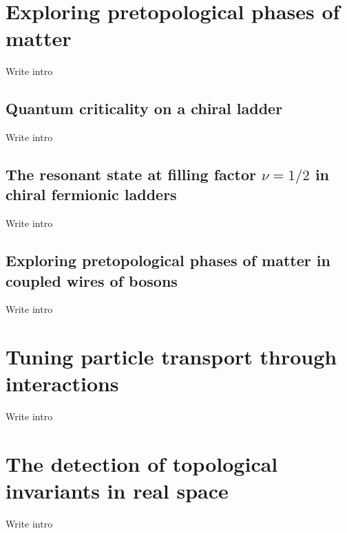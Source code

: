 
\chapter{Exploring pretopological phases of matter}
\label{ch:Exploring_pretopological_phases_of_matter}
Write intro
\section{Quantum criticality on a chiral ladder}
Write intro

\section{The resonant state at filling factor \texorpdfstring{$\nu=1/2$}{nu=1/2} in chiral fermionic ladders}
Write intro

\section{Exploring pretopological phases of matter in coupled wires of bosons}
Write intro


\chapter{Tuning particle transport through interactions}
\label{ch:Tuning_particle_transport_through_interactions}
Write intro



\chapter{The detection of topological invariants in real space}
\label{ch:The_detection_of_topological_invariants_in_real_space}
Write intro

